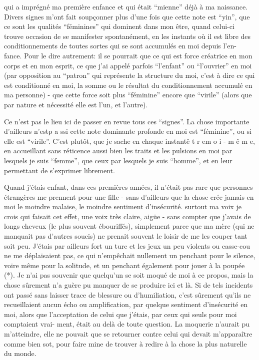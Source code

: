 qui a imprégné ma première enfance et qui était ``mienne'' déjà à ma naissance.
Divers signes m'ont fait soupçonner plus d'une fois que cette note est ``yin'',
que ce sont les qualités ``féminines'' qui dominent dans mon être, quand celui-ci
trouve occasion de se manifester spontanément, en les instants où il est libre
des conditionnements de toutes sortes qui se sont accumulés en moi depuis l'en-\newline
fance. Pour le dire autrement: il se pourrait que ce qui est force créatrice en
mon corps et en mon esprit, ce que j'ai appelé parfois ``l'enfant'' ou ``l'ouvrier''
en moi (par opposition au ``patron'' qui représente la structure du moi, c'est à
dire ce qui est conditionné en moi, la somme ou le résultat du conditionnement
accumulé en ma personne) - que cette force soit plus ``féminine'' encore que
``virile'' (alors que par nature et nécessité elle est l'un, et l'autre).

Ce n'est pas le lieu ici de passer en revue tous ces ``signes''. La chose
importante d'ailleurs n'est\quad p a s\quad si cette note dominante profonde en moi
est ``féminine'', ou si elle est ``virile''. C'est plutôt, que je sache en chaque
instant\quad ê t r e\quad m o i - m ê m e\quad, en accueillant sans réticence aussi bien
les traits et les pulsions en moi par lesquels je\unsure{:} suis ``femme'', que ceux par
lesquels je suis ``homme'', et en leur permettant de s'exprimer librement.

Quand j'étais enfant, dans ces premières années, il n'était pas rare que 
personnes étrangères me prennent pour une fille - sans d'ailleurs que la chose
crée jamais en moi le moindre malaise, le moindre sentiment d'insécurité. 
surtout ma voix je crois qui faisait cet effet, une voix très claire, aigüe -
sans compter que j'avais de longs cheveux (le plus souvent ébouriffés), 
simplement parce que ma mère (qui ne manquait pas d'autres soucis) ne prenait 
souvent le loisir de me les couper tant soit peu. J'étais par ailleurs fort 
un turc et les jeux un peu violents ou casse-cou ne me déplaisaient pas, ce qui
n'empêchait nullement un penchant pour le silence, voire même pour la solitude,
et un penchant également pour jouer à la poupée (*). Je n'ai pas souvenir que
quelqu'un se soit moqué de moi à ce propos, mais la chose sûrement n'a guère pu
manquer de se produire ici et là. Si de tels incidents ont passé sans laisser
trace de blessure ou d'humiliation, c'est sûrement qu'ils ne recueillaient aucun
écho ou amplification, par quelque sentiment d'insécurité en moi, alors que
l'acceptation de celui que j'étais, par ceux qui seuls pour moi comptaient vrai-\newline
ment, était au delà de toute question. La moquerie n'aurait pu m'atteindre,
elle ne pouvait que se retourner contre celui qui devait m'apparaître comme bien
sot, pour faire mine de trouver à redire à la chose la plus naturelle du monde.

